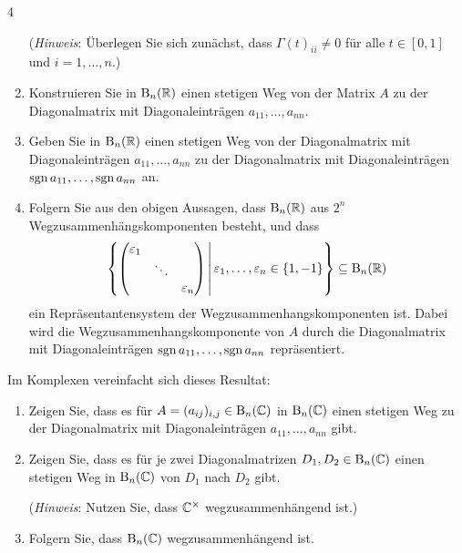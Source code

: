 \begin{question}[subtitle = Die Wegzusammenhangskomponenten der oberen Dreiecksmatrizen]{4}
\begin{enumerate}[leftmargin=*, resume]
      (\emph{Hinweis}:
       Überlegen Sie sich zunächst, dass $\Gamma(t)_{ii} \neq 0$ für alle $t \in [0,1]$ und $i = 1, \dotsc, n$.)
    \item
      Konstruieren Sie in $\operatorname{B}_n(\mathbb{R})$ einen stetigen Weg von der Matrix $A$ zu der Diagonalmatrix mit Diagonaleinträgen $a_{11}, \dotsc, a_{nn}$.
    \item
      Geben Sie in $\operatorname{B}_n(\mathbb{R})$ einen stetigen Weg von der Diagonalmatrix mit Diagonaleinträgen $a_{11}, \dotsc, a_{nn}$ zu der Diagonalmatrix mit Diagonaleinträgen $\operatorname{sgn} a_{11}, \dotsc, \operatorname{sgn} a_{nn}$ an.
    \item
      Folgern Sie aus den obigen Aussagen, dass $\operatorname{B}_n(\mathbb{R})$ aus $2^n$ Wegzusammenhängskomponenten besteht, und dass
      \[
        \left\{
          \begin{pmatrix}
            \varepsilon_1 &         &                 \\
                          & \ddots  &                 \\
                          &         & \varepsilon_n
          \end{pmatrix}
          \,\middle|\,
          \varepsilon_1, \dotsc, \varepsilon_n \in \{1,-1\}
        \right\}
        \subseteq
        \operatorname{B}_n(\mathbb{R})
      \]
      ein Repräsentantensystem der Wegzusammenhangskomponenten ist.
      Dabei wird die Weg\-zu\-sam\-men\-hangs\-kom\-po\-nen\-te von $A$ durch die Diagonalmatrix mit Diagonaleinträgen $\operatorname{sgn} a_{11}, \dotsc, \operatorname{sgn} a_{nn}$ repräsentiert.
  \end{enumerate}
  Im Komplexen vereinfacht sich dieses Resultat:
  \begin{enumerate}[leftmargin=*, resume]
    \item
      Zeigen Sie, dass es für $A = (a_{ij})_{i,j} \in \operatorname{B}_n(\mathbb{C})$ in $\operatorname{B}_n(\mathbb{C})$ einen stetigen Weg zu der Diagonalmatrix mit Diagonaleinträgen $a_{11}, \dotsc, a_{nn}$ gibt.
    \item
      Zeigen Sie, dass es für je zwei Diagonalmatrizen $D_1, D_2 \in \operatorname{B}_n(\mathbb{C})$ einen stetigen Weg in $\operatorname{B}_n(\mathbb{C})$ von $D_1$ nach $D_2$ gibt.
      
      (\emph{Hinweis}:
       Nutzen Sie, dass $\mathbb{C}^\times$ wegzusammenhängend ist.)
    \item
      Folgern Sie, dass $\operatorname{B}_n(\mathbb{C})$ wegzusammenhängend ist.
  \end{enumerate}
\end{question}










